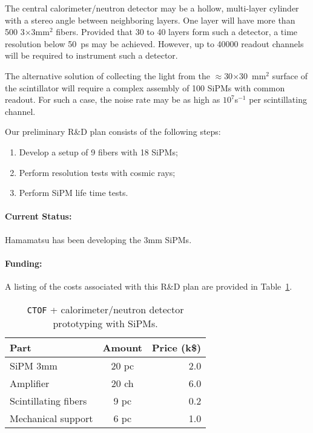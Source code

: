 \documentclass[12pt]{article}
\begin{document}
The central calorimeter/neutron detector may be a hollow, multi-layer 
cylinder with a stereo angle between neighboring layers.  One layer will 
have more than 500 3$\times$3mm$^2$ fibers.  Provided that 30 to 40 layers 
form such a detector, a time resolution below 50~ps may be achieved.  
However, up to 40000 readout channels will be required to instrument such a
detector.   
  
The alternative solution of collecting the light from the 
$\approx$30$\times$30~mm$^2$ surface of the scintillator will require a 
complex assembly of 100 SiPMs with common readout.  For such a case, the 
noise rate may be as high as $10^7$s$^{-1}$ per scintillating channel. 

Our preliminary R\&D plan consists of the following steps:

\begin{enumerate}
  \item Develop a setup of 9 fibers with 18 SiPMs;    
  \item Perform resolution tests with cosmic rays;
  \item Perform SiPM life time tests.    
\end{enumerate}

\paragraph{Current Status:} Hamamatsu has been developing the 3mm SiPMs.

\paragraph{Funding:} A listing of the costs associated with this R\&D
plan are provided in Table~\ref{table5}.

\begin{table}[htbp]
\begin{center}
\begin{tabular}{|l|c|r|} \hline
Part & Amount& Price (k\$)                               \\ \hline 
SiPM  3mm                   & 20 pc             &   2.0  \\ \hline
Amplifier                   & 20 ch             &   6.0  \\ \hline
Scintillating fibers        & 9  pc             &   0.2  \\ \hline
Mechanical support          & 6  pc             &   1.0  \\ \hline
\end{tabular}
\end{center}
\caption{{\tt CTOF} + calorimeter/neutron detector prototyping with SiPMs.}
\label{table5}
\end{table}
\end{document}
